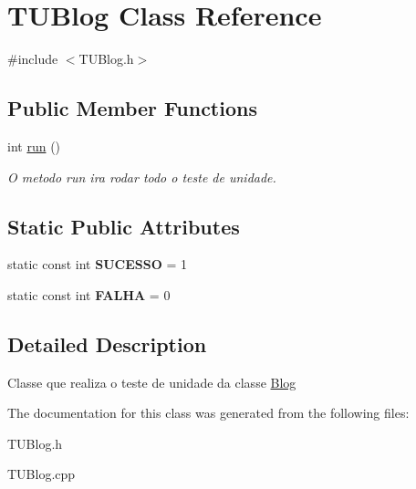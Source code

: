 \hypertarget{classTUBlog}{}\section{T\+U\+Blog Class Reference}
\label{classTUBlog}


{\ttfamily \#include $<$T\+U\+Blog.\+h$>$}

\subsection*{Public Member Functions}
\begin{DoxyCompactItemize}
\item 
int \hyperlink{classTUBlog_a2fd7a16d1602635ab7790e98f4761c3d}{run} ()\hypertarget{classTUBlog_a2fd7a16d1602635ab7790e98f4761c3d}{}\label{classTUBlog_a2fd7a16d1602635ab7790e98f4761c3d}

\begin{DoxyCompactList}\small\item\em O metodo run ira rodar todo o teste de unidade. \end{DoxyCompactList}\end{DoxyCompactItemize}
\subsection*{Static Public Attributes}
\begin{DoxyCompactItemize}
\item 
static const int {\bfseries S\+U\+C\+E\+S\+SO} = 1\hypertarget{classTUBlog_a6967148a5d72c24b8a6e06a57aff197b}{}\label{classTUBlog_a6967148a5d72c24b8a6e06a57aff197b}

\item 
static const int {\bfseries F\+A\+L\+HA} = 0\hypertarget{classTUBlog_a52401d0ce78d67567aa4bd41d153bb70}{}\label{classTUBlog_a52401d0ce78d67567aa4bd41d153bb70}

\end{DoxyCompactItemize}


\subsection{Detailed Description}
Classe que realiza o teste de unidade da classe \hyperlink{classBlog}{Blog} 

The documentation for this class was generated from the following files\+:\begin{DoxyCompactItemize}
\item 
T\+U\+Blog.\+h\item 
T\+U\+Blog.\+cpp\end{DoxyCompactItemize}
